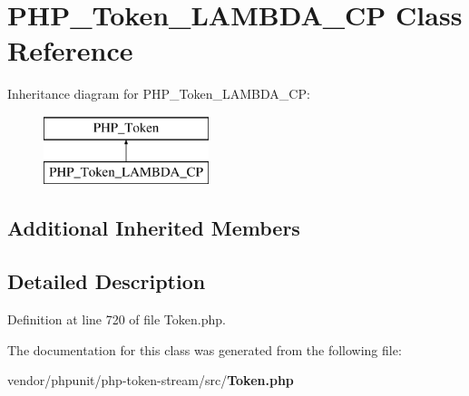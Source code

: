 \section{P\+H\+P\+\_\+\+Token\+\_\+\+L\+A\+M\+B\+D\+A\+\_\+\+C\+P Class Reference}
\label{class_p_h_p___token___l_a_m_b_d_a___c_p}
Inheritance diagram for P\+H\+P\+\_\+\+Token\+\_\+\+L\+A\+M\+B\+D\+A\+\_\+\+C\+P\+:\begin{figure}[H]
\begin{center}
\leavevmode
\includegraphics[height=2.000000cm]{class_p_h_p___token___l_a_m_b_d_a___c_p}
\end{center}
\end{figure}
\subsection*{Additional Inherited Members}


\subsection{Detailed Description}


Definition at line 720 of file Token.\+php.



The documentation for this class was generated from the following file\+:\begin{DoxyCompactItemize}
\item 
vendor/phpunit/php-\/token-\/stream/src/{\bf Token.\+php}\end{DoxyCompactItemize}
